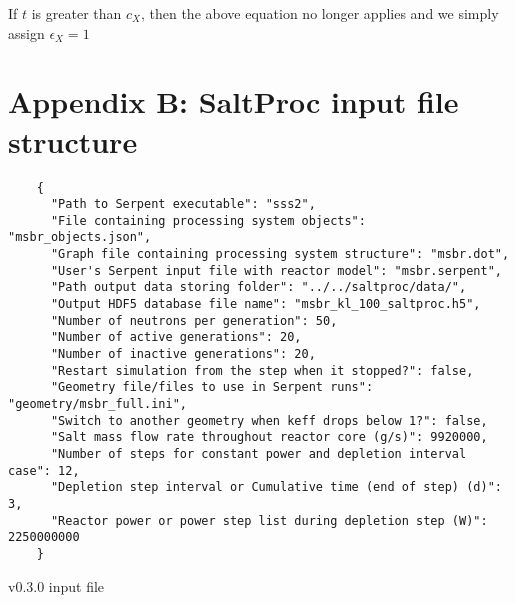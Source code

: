 If $t$ is greater than $c_{X}$, then the above equation no longer applies and we simply assign $\epsilon_{X} = 1$

\newpage
\appendix
\chapter*{Appendix B: SaltProc input file structure}
\label{appex:input-files}

\begin{listing}[!ht]
    \begin{verbatim}
    {
      "Path to Serpent executable": "sss2",
      "File containing processing system objects": "msbr_objects.json",
      "Graph file containing processing system structure": "msbr.dot",
      "User's Serpent input file with reactor model": "msbr.serpent",
      "Path output data storing folder": "../../saltproc/data/",
      "Output HDF5 database file name": "msbr_kl_100_saltproc.h5",
      "Number of neutrons per generation": 50,
      "Number of active generations": 20,
      "Number of inactive generations": 20,
      "Restart simulation from the step when it stopped?": false,
      "Geometry file/files to use in Serpent runs": "geometry/msbr_full.ini",
      "Switch to another geometry when keff drops below 1?": false,
      "Salt mass flow rate throughout reactor core (g/s)": 9920000,
      "Number of steps for constant power and depletion interval case": 12,
      "Depletion step interval or Cumulative time (end of step) (d)": 3,
      "Reactor power or power step list during depletion step (W)": 2250000000
    }
    \end{verbatim}
    \caption{\SaltProc v0.3.0 input file}
    \label{listing:1}
\end{listing}


